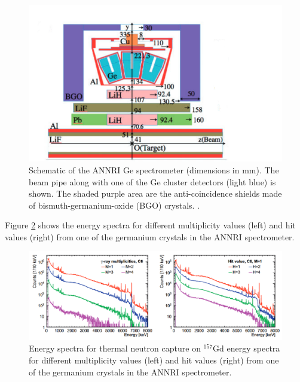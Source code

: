 \begin{figure}

        \includegraphics[width=\textwidth]{Figures/annrigd.png}
        \caption{Schematic of the ANNRI Ge spectrometer (dimensions in mm). The beam pipe along with one of the Ge cluster detectors (light blue) is shown. The shaded purple area are the anti-coincidence shields made of bismuth-germanium-oxide (BGO) crystals. \cite{10.1093/ptep/ptz002}.}
        \label{fig:annrigd}
    
\end{figure}

Figure \ref{fig:annrigdenergyspectra} shows the energy spectra for different multiplicity values (left) and hit values (right) from one of the germanium crystals in the ANNRI spectrometer. 

\begin{figure}
\includegraphics[width=\textwidth]{Figures/annrigdenergyspectra.png}
\caption{Energy spectra for thermal neutron capture on ${ }^{157} \mathrm{Gd}$ energy spectra for different multiplicity values (left) and hit values (right) from one of the germanium crystals in the ANNRI spectrometer.}
\label{fig:annrigdenergyspectra}
\end{figure}

